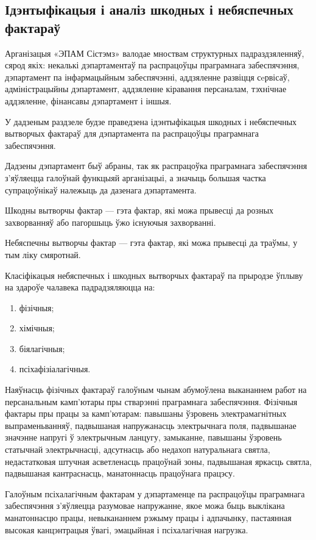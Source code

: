 \subsection{Ідэнтыфікацыя і аналіз шкодных і небяспечных фактараў}

Арганізацыя «ЭПАМ Сістэмз» валодае мноствам структурных падраздзяленняў, сярод якіх: некалькі дэпартаментаў па распрацоўцы праграмнага забеспячэння, дэпартамент па інфармацыйным забеспячэнні, аддзяленне развіцця сeрвісаў, адміністрацыйны дэпартамент, аддзяленне кіравання персаналам, тэхнічнае аддзяленне, фінансавы дэпартамент і іншыя.

У дадзеным раздзеле будзе праведзена ідэнтыфікацыя шкодных і небяспечных вытворчых фактараў для дэпартамента па распрацоўцы праграмнага забеспячэння.

Дадзены дэпартамент быў абраны, так як распрацоўка праграмнага забеспячэння
з'яўляецца галоўнай функцыяй арганізацыі, а значыць большая частка супрацоўнікаў належыць да дазенага дэпартамента.

Шкодны вытворчы фактар --- гэта фактар, які можа прывесці да розных захворванняў або пагоршыць ўжо існуючыя захворванні.

Небяспечны вытворчы фактар --- гэта фактар, які можа прывесці да траўмы, у тым ліку смяротнай.

Класіфікацыя небяспечных і шкодных вытворчых фактараў па прыродзе ўплыву на здароўе чалавека падрадзяляюцца на:
\begin{enumerate}
    \item фізічныя;
    \item хімічныя;
    \item біялагічныя;
    \item псіхафізіалагічныя.
\end{enumerate}

Наяўнасць фізічных фактараў галоўным чынам абумоўлена выкананнем работ на персанальным камп'ютары пры стварэнні праграмнага забеспячэння. Фізічныя фактары пры працы за камп'ютарам: павышаны ўзровень электрамагнітных выпраменьванняў, падвышаная напружанасць электрычнага поля, падвышанае значэнне напругі ў электрычным ланцугу, замыканне, павышаны ўзровень статычнай электрычнасці, адсутнасць або недахоп натуральнага святла, недастатковая штучная асветленасць працоўнай зоны, падвышаная яркасць святла, падвышаная кантраснасць, манатоннасць працоўнага працэсу.

Галоўным псіхалагічным фактарам у дэпартаменце па распрацоўцы праграмнага забеспячэння з'яўляецца разумовае напружанне, якое можа быць выклікана манатоннасцю працы, невыкананнем рэжыму працы і адпачынку, пастаянная высокая канцэнтрацыя ўвагі, эмацыйная і псіхалагічная нагрузка.

